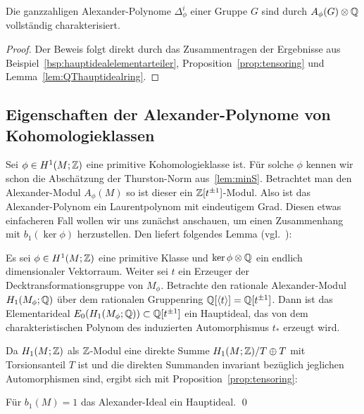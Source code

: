 \begin{cor}
	Die ganzzahligen Alexander-Polynome $\Delta_\phi^i$ einer Gruppe $G$ sind durch $A_\phi(G) \otimes \mathbb{Q}$ vollständig charakterisiert.
\end{cor}
\begin{proof}
	Der Beweis folgt direkt durch das Zusammentragen der Ergebnisse aus Beispiel~\ref{bsp:hauptidealelementarteiler}, Proposition~\ref{prop:tensoring} und Lemma~\ref{lem:QThauptidealring}.
\end{proof}

    \subsection{Eigenschaften der Alexander-Polynome von Kohomologieklassen}
        Sei $\phi\in H^1(M;\mathbb{Z})$ eine primitive Kohomologieklasse ist. Für solche $\phi$ kennen wir schon die Abschätzung der Thurston-Norm aus~\ref{lem:minS}. Betrachtet man den Alexander-Modul $A_\phi(M)$ so ist dieser ein $\mathbb{Z}[t^{\pm1}]$-Modul. Also ist das Alexander-Polynom ein Laurentpolynom mit eindeutigem Grad. Diesen etwas einfacheren Fall wollen wir uns zunächst anschauen, um einen Zusammenhang mit $b_1(\ker\phi)$ herzustellen. Den liefert folgendes Lemma (vgl.~\cite[Assertion~4]{Milnor.2009}):
\begin{lem}
	\label{lem:charPol}
	Es sei $\phi \in H^1(M;\mathbb{Z})$ eine primitive Klasse und $\ker \phi \otimes \mathbb{Q}$ ein endlich dimensionaler Vektorraum. Weiter sei $t$ ein Erzeuger der Decktransformationsgruppe von $M_\phi$. Betrachte den rationale Alexander-Modul $H_1(M_\phi;\mathbb{Q})$ über dem rationalen Gruppenring $\mathbb{Q}[\langle t \rangle] = \mathbb{Q}[t^{\pm 1}]$. Dann ist das Elementarideal $E_0(H_1(M_\phi;\mathbb{Q}))\subset \mathbb{Q}[t^{\pm1}]$ ein Hauptideal, das von dem charakteristischen Polynom des induzierten Automorphismus $t_*$ erzeugt wird.
\end{lem}
Da $H_1(M;\mathbb{Z})$ als $\mathbb{Z}$-Modul eine direkte Summe $H_1(M;\mathbb{Z})/T \oplus T$ mit Torsionsanteil $T$ ist und die direkten Summanden invariant bezüglich jeglichen Automorphismen sind, ergibt sich mit Proposition~\ref{prop:tensoring}:
\begin{cor}
	Für $b_1(M)=1$ das Alexander-Ideal ein Hauptideal. \qed
\end{cor}

